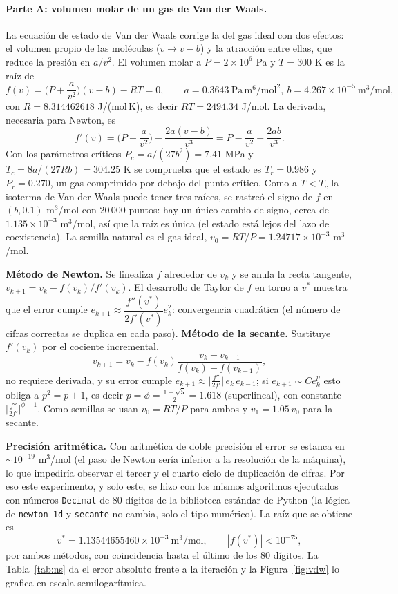 \documentclass[11pt,a4paper]{article}
\begin{document}
\paragraph{Parte A: volumen molar de un gas de Van der Waals.}
La ecuación de estado de Van der Waals corrige la del gas ideal con dos efectos: el volumen propio de las moléculas ($v\to v-b$) y la atracción entre ellas, que reduce la presión en $a/v^2$. El volumen molar a $P=2\times10^6$ Pa y $T=300$ K es la raíz de
\begin{equation}
f(v)=\Big(P+\frac a{v^2}\Big)(v-b)-RT=0,\qquad a=0.3643\ \mathrm{Pa\,m^6/mol^2},\ b=4.267\times10^{-5}\ \mathrm{m^3/mol}, \label{eq:vdw}
\end{equation}
con $R=8.314462618$ J/(mol\,K), es decir $RT=2494.34$ J/mol. La derivada, necesaria para Newton, es
\[
f'(v)=\Big(P+\frac a{v^2}\Big)-\frac{2a(v-b)}{v^3}=P-\frac a{v^2}+\frac{2ab}{v^3}.
\]
Con los parámetros críticos $P_c=a/(27b^2)=7.41$ MPa y $T_c=8a/(27Rb)=304.25$ K se comprueba que el estado es $T_r=0.986$ y $P_r=0.270$, un gas comprimido por debajo del punto crítico. Como a $T<T_c$ la isoterma de Van der Waals puede tener tres raíces, se rastreó el signo de $f$ en $(b,0.1)$ m$^3$/mol con 20\,000 puntos: hay un único cambio de signo, cerca de $1.135\times10^{-3}$ m$^3$/mol, así que la raíz es única (el estado está lejos del lazo de coexistencia). La semilla natural es el gas ideal, $v_0=RT/P=1.24717\times10^{-3}$ m$^3$/mol.

\textbf{Método de Newton.} Se linealiza $f$ alrededor de $v_k$ y se anula la recta tangente, $v_{k+1}=v_k-f(v_k)/f'(v_k)$. El desarrollo de Taylor de $f$ en torno a $v^*$ muestra que el error cumple $e_{k+1}\approx\dfrac{f''(v^*)}{2f'(v^*)}e_k^2$: convergencia cuadrática (el número de cifras correctas se duplica en cada paso). \textbf{Método de la secante.} Sustituye $f'(v_k)$ por el cociente incremental,
\[
v_{k+1}=v_k-f(v_k)\frac{v_k-v_{k-1}}{f(v_k)-f(v_{k-1})},
\]
no requiere derivada, y su error cumple $e_{k+1}\approx\big|\tfrac{f''}{2f'}\big|\,e_k\,e_{k-1}$; si $e_{k+1}\sim Ce_k^{p}$ esto obliga a $p^2=p+1$, es decir $p=\phi=\tfrac{1+\sqrt5}2=1.618$ (superlineal), con constante $\big|\tfrac{f''}{2f'}\big|^{\phi-1}$. Como semillas se usan $v_0=RT/P$ para ambos y $v_1=1.05\,v_0$ para la secante.

\textbf{Precisión aritmética.} Con aritmética de doble precisión el error se estanca en $\sim10^{-19}$ m$^3$/mol (el paso de Newton sería inferior a la resolución de la máquina), lo que impediría observar el tercer y el cuarto ciclo de duplicación de cifras. Por eso este experimento, y solo este, se hizo con los mismos algoritmos ejecutados con números \texttt{Decimal} de 80 dígitos de la biblioteca estándar de Python (la lógica de \texttt{newton\_1d} y \texttt{secante} no cambia, solo el tipo numérico). La raíz que se obtiene es
\[
v^*=1.13544655460\times10^{-3}\ \mathrm{m^3/mol},\qquad |f(v^*)|<10^{-75},
\]
por ambos métodos, con coincidencia hasta el último de los 80 dígitos. La Tabla~\ref{tab:ns} da el error absoluto frente a la iteración y la Figura~\ref{fig:vdw} lo grafica en escala semilogarítmica.
\end{document}
